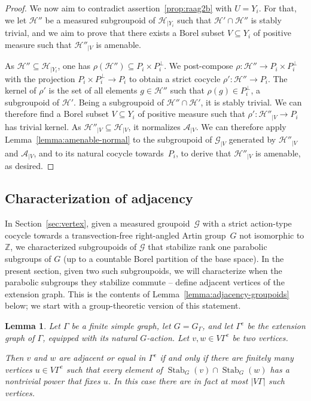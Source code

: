 \documentclass[JEP,XML,SOM,Unicode,NoFloatCountersInSection,published]{cedram}
\let\mathcal\mathscr
\theoremstyle{plain}
\newtheorem{lemma}[theo]{Lemma}
\theoremstyle{definition}
\newcommand{\cala}{\mathcal{A}}
\newcommand{\calg}{\mathcal{G}}
\newcommand{\calh}{\mathcal{H}}
\newcommand{\Stab}{\operatorname{Stab}}
\begin{document}
\begin{proof}
We now aim to contradict assertion~\eqref{prop:raag2b} with $U=Y_i$. For that, we let $\calh''$ be a measured subgroupoid of $\calh_{|Y_i}$ such that $\calh'\cap\calh''$ is stably trivial, and we aim to prove that there exists a Borel subset $V\subseteq Y_i$ of positive measure such that $\calh''_{|V}$ is amenable.

As $\calh''\subseteq\calh_{|Y_i}$, one has $\rho(\calh'')\subseteq P_i\times P_i^{\perp}$. We post-compose $\rho:\calh''\to P_i\times P_i^{\perp}$ with the projection $P_i\times P_i^{\perp}\to P_i$ to obtain a strict cocycle $\rho':\calh''\to P_i$. The kernel of $\rho'$ is the set of all elements $g\in\calh''$ such that $\rho(g)\in P_i^{\perp}$, a subgroupoid of $\calh'$. Being a subgroupoid of $\calh''\cap\calh'$, it is stably trivial. We can therefore find a Borel subset $V\subseteq Y_i$ of positive measure such that $\rho':\calh''_{|V}\to P_i$ has trivial kernel. As $\calh''_{|V}\subseteq\calh_{|V}$, it normalizes $\cala_{|V}$. We can therefore apply Lemma~\ref{lemma:amenable-normal} to the subgroupoid of $\calg_{|V}$ generated by $\calh''_{|V}$ and $\cala_{|V}$, and to its natural cocycle towards~$P_i$, to derive that $\calh''_{|V}$ is amenable, as desired.
\end{proof}

\subsection{Characterization of adjacency}

In Section~\ref{sec:vertex}, given a measured groupoid~$\calg$ with a strict action-type cocycle towards a transvection-free right-angled Artin group~$G$ not isomorphic to $\mathbb{Z}$, we characterized subgroupoids of $\calg$ that stabilize rank one parabolic subgroups of $G$ (up to a countable Borel partition of the base space). In the present section, given two such subgroupoids, we will characterize when the parabolic subgroups they stabilize commute -- \ie define adjacent vertices of the extension graph. This is the contents of Lemma~\ref{lemma:adjacency-groupoids} below; we start with a group-theoretic version of this statement.

\begin{lemma}
\label{lem:fix point}
Let $\Gamma$ be a finite simple graph, let $G=G_\Gamma$, and let $\Gamma^e$ be the extension graph of $\Gamma$, equipped with its natural $G$-action. Let $v,w\in V\Gamma^e$ be two vertices.

Then $v$ and $w$ are adjacent or equal in $\Gamma^e$ if and only if there are finitely many vertices $u\in V\Gamma^e$ such that every element of $\Stab_G(v)\cap\Stab_G(w)$ has a nontrivial power that fixes $u$. In this case there are in fact at most $|V\Gamma|$ such vertices.
\end{lemma}
\end{document}
